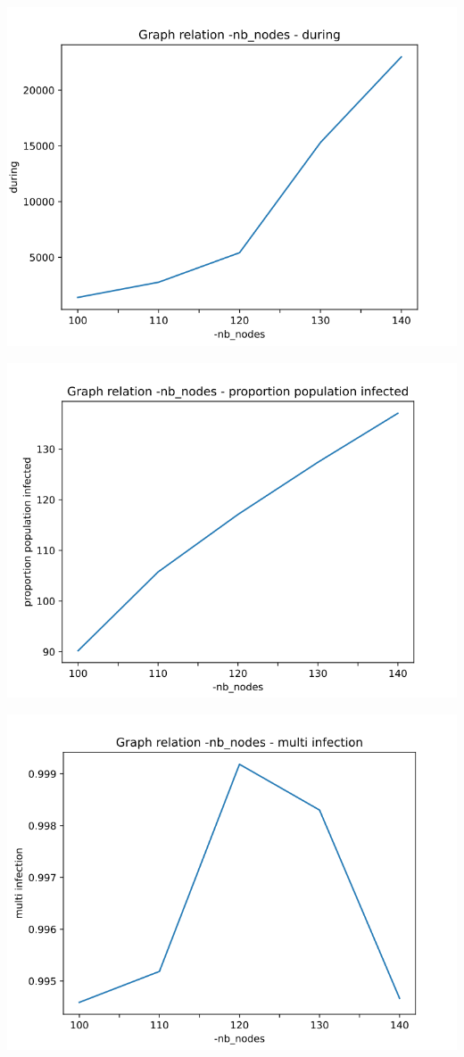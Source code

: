 \documentclass[a4paper, 11pt]{article}
\begin{document}
				
				\includegraphics[scale=0.45]{attachements/nb_nodes_during.png}
				
				\includegraphics[scale=0.45]{attachements/nb_nodes_proportion.png}
				
				\includegraphics[scale=0.45]{attachements/nb_nodes_multi_infection.png}
				
\end{document}
